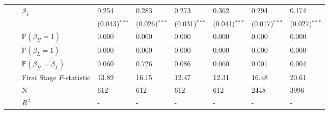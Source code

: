 \begin{tabular*}{\textwidth}{@{\extracolsep{\fill}}llllllll}
~~&$\beta_L$&0.254&0.283&0.273&0.362&0.294&0.174\tabularnewline
~~&&{\scriptsize (0.043)$^{***}$}&{\scriptsize (0.026)$^{***}$}&{\scriptsize (0.031)$^{***}$}&{\scriptsize (0.041)$^{***}$}&{\scriptsize (0.017)$^{***}$}&{\scriptsize (0.027)$^{***}$}\tabularnewline
~~&$\mathbb{P}(\beta_H = 1)$&0.000&0.000&0.000&0.000&0.000&0.000\tabularnewline
~~&$\mathbb{P}(\beta_L = 1)$&0.000&0.000&0.000&0.000&0.000&0.000\tabularnewline
~~&$\mathbb{P}(\beta_H = \beta_L)$&0.060&0.726&0.086&0.060&0.001&0.004\tabularnewline
~~&First Stage $F$-statistic&13.89&16.15&12.47&12.31&16.48&20.61\tabularnewline
~~&N&612&612&612&612&2448&3996\tabularnewline
~~&$R^2$&-&-&-&-&-&-\tabularnewline
\hline
\end{tabular*}

